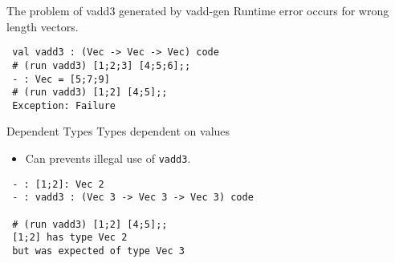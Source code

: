 \documentclass[dvipdfmx,aspectratio=169, 20pt]{beamer}
\begin{document}
\begin{frame}[fragile]{The problem of vadd3 generated by vadd-gen}
    Runtime error occurs for wrong length vectors.
    \begin{verbatim}
 val vadd3 : (Vec -> Vec -> Vec) code
 # (run vadd3) [1;2;3] [4;5;6];;
 - : Vec = [5;7;9]
 # (run vadd3) [1;2] [4;5];;
 Exception: Failure
    \end{verbatim}
    \note{
    }
\end{frame}

\begin{frame}[fragile]{Dependent Types}
    \renewcommand{\V}{\text{Vec}\ }
    Types dependent on values
    \begin{itemize}
        \item Can prevents illegal use of {\verb|vadd3|}.
    \end{itemize}
 \begin{verbatim}
 - : [1;2]: Vec 2
 - : vadd3 : (Vec 3 -> Vec 3 -> Vec 3) code

 # (run vadd3) [1;2] [4;5];;
 [1;2] has type Vec 2
 but was expected of type Vec 3
 \end{verbatim}
\end{frame}

\end{document}
